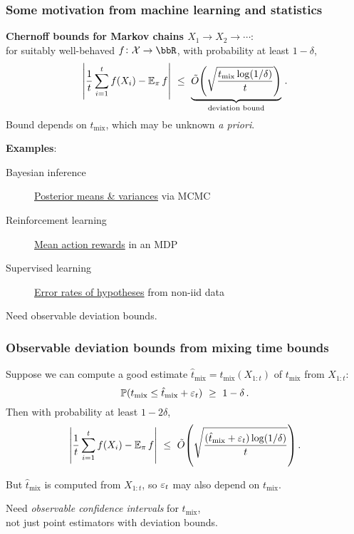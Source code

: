 \documentclass[11pt,compress,blue4]{beamer}
\newcommand\tmix{\ensuremath{t_{\operatorname{mix}}}}
\newcommand\tmixhat{\ensuremath{\hat{t}_{\operatorname{mix}}}}
\newcommand\states{\ensuremath{\mathcal{X}}}
\begin{document}

\begin{frame}
  \frametitle{Some motivation from machine learning and statistics}

  \textbf{Chernoff bounds for Markov chains $X_1\to X_2\to\dotsb$}:
  \\
  for suitably well-behaved $f \colon \states \to \bbR$,
  with probability at least $1-\delta$,
  \[
    \Abs{
      \frac1t\sum_{i=1}^t f(X_i)
      -
      \E_\pi f
    }
    \ \leq \
    \underbrace{
      \tilde O\Parens{
        \sqrt{
          \frac{\tmix \log(1/\delta)}{t}
        }
      }
    }_{\text{deviation bound}}
    \,.
  \]
  Bound depends on $\tmix$, which may be unknown \emph{a priori}.

  \bigskip
  \textbf{Examples}:
  \begin{description}
    \item[Bayesian inference]
      \underline{Posterior means \& variances} via MCMC

    \item[Reinforcement learning]
      \underline{Mean action rewards} in an MDP

    \item[Supervised learning]
      \underline{Error rates of hypotheses} from non-iid data

  \end{description}

  \begin{center}
    Need observable deviation bounds.
  \end{center}

\end{frame}


\begin{frame}
  \frametitle{Observable deviation bounds from mixing time bounds}

  Suppose we can compute a good estimate $\tmixhat =
  \tmixhat(X_{1:t})$ of $\tmix$ from $X_{1:t}$:
  \[
    \P(\tmix \leq \tmixhat + \veps_t)
    \ \geq \
    1-\delta
    \,.
  \]
  Then with probability at least $1-2\delta$,
  \[
    \Abs{
      \frac1t\sum_{i=1}^t f(X_i)
      -
      \E_\pi f
    }
    \ \leq \
    \tilde O\Parens{
      \sqrt{
        \frac{\parens{\tmixhat + \veps_t} \log(1/\delta)}{t}
      }
    }
    \,.
  \]

  But $\tmixhat$ is computed from $X_{1:t}$, so $\varepsilon_t$ may also
  depend on $\tmix$.

  \begin{center}
    Need \emph{observable confidence intervals} for $\tmix$, \\
    not just point estimators with deviation bounds.
  \end{center}

\end{frame}
\end{document}
